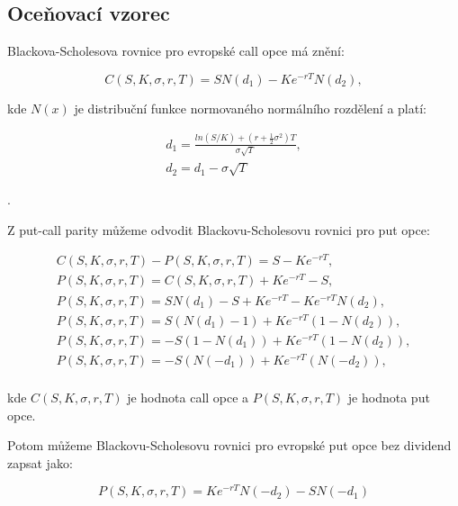 \documentclass[male,czech,api_bc]{kitheses}
\begin{document}
  \parencites[s.~640]{BlackScholes1973}

  \subsection{Oceňovací vzorec}

  Blackova-Scholesova rovnice pro evropské call opce má znění:

  \begin{equation}
    C(S, K, \sigma, r, T) = SN(d_1) - Ke^{-rT}N(d_2),
  \end{equation}

  kde $N(x)$ je distribuční funkce normovaného normálního rozdělení a platí:

  \begin{gather}
    \label{eq:d_1}
    d_1 = \frac{ln(S/K) + (r + \frac{1}{2}\sigma^2)T}{\sigma \sqrt{T}}, \\
    \label{eq:d_2}
    d_2 = d_1 - \sigma \sqrt{T}
  \end{gather}

  \parencites[s.~363,365]{McDonald2013}[rovnice~13]{BlackScholes1973}[rovnice~1.1]{Haug2007}. 

  Z put-call parity můžeme odvodit Blackovu-Scholesovu rovnici pro put opce:

  \begin{gather*}
    C(S, K, \sigma, r, T) - P(S, K, \sigma, r, T) = S - Ke^{-rT}, \\
    P(S, K, \sigma, r, T) = C(S, K, \sigma, r, T) + Ke^{-rT} - S, \\
    P(S, K, \sigma, r, T) = SN(d_1) - S + Ke^{-rT} - Ke^{-rT}N(d_2), \\
    P(S, K, \sigma, r, T) = S(N(d_1) - 1) + Ke^{-rT} (1 - N(d_2)),  \\
    P(S, K, \sigma, r, T) = -S(1 - N(d_1)) + Ke^{-rT} (1 - N(d_2)),  \\
    P(S, K, \sigma, r, T) = -S(N(-d_1)) + Ke^{-rT} (N(-d_2)), \\
  \end{gather*}

  kde $C(S, K, \sigma, r, T)$ je hodnota call opce a $P(S, K, \sigma, r, T)$ je hodnota put opce.

  Potom můžeme Blackovu-Scholesovu rovnici pro evropské put opce bez dividend zapsat jako:

  \begin{equation}
    P(S, K, \sigma, r, T) = Ke^{-rT}N(-d_2) - SN(-d_1)
  \end{equation}
\end{document}
